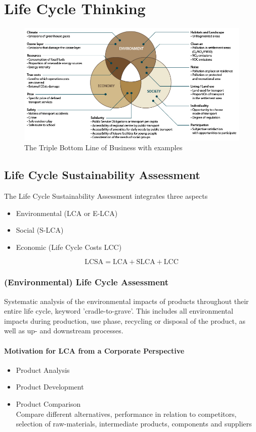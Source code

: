 \documentclass[11pt]{article}
\theoremstyle{definition}
\begin{document}
\clearpage
\section{Life Cycle Thinking}

\begin{figure}[H]
	\centering
	\includegraphics[width=0.8\linewidth]{img/three_modes_development.jpg}
	\caption{The Triple Bottom Line of Business with examples}
\end{figure}

\subsection{Life Cycle Sustainability Assessment}
The Life Cycle Sustainability Assessment integrates three aspects
\begin{itemize}
	\item Environmental (LCA or E-LCA)
	\item Social (S-LCA)
	\item Economic (Life Cycle Costs LCC)
\end{itemize}
\begin{equation*}
	\text{LCSA} = \text{LCA} + \text{SLCA} + \text{LCC}
\end{equation*}

\subsubsection{(Environmental) Life Cycle Assessment}
Systematic analysis of the environmental impacts of products throughout their entire life cycle, keyword 'cradle-to-grave'. This includes all environmental impacts during production, use phase, recycling or disposal of the product, as well as up- and downstream processes.

\paragraph{Motivation for LCA from a Corporate Perspective}
\begin{itemize}
	\item Product Analysis
	\item Product Development
	\item Product Comparison\\
	Compare different alternatives, performance in relation to competitors, selection of raw-materials, intermediate products, components and suppliers
\end{itemize}
\end{document}
